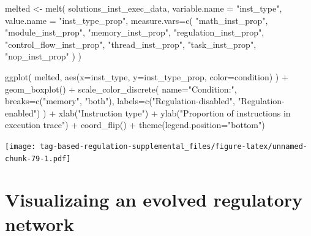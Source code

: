 \documentclass[
]{book}
\newenvironment{Shaded}{\begin{snugshade}}{\end{snugshade}}
\newcommand{\AttributeTok}[1]{\textcolor[rgb]{0.77,0.63,0.00}{#1}}
\newcommand{\FunctionTok}[1]{\textcolor[rgb]{0.00,0.00,0.00}{#1}}
\newcommand{\NormalTok}[1]{#1}
\newcommand{\OtherTok}[1]{\textcolor[rgb]{0.56,0.35,0.01}{#1}}
\newcommand{\SpecialCharTok}[1]{\textcolor[rgb]{0.00,0.00,0.00}{#1}}
\newcommand{\StringTok}[1]{\textcolor[rgb]{0.31,0.60,0.02}{#1}}
\begin{document}
\begin{Shaded}
\begin{Highlighting}[]
\NormalTok{melted }\OtherTok{\textless{}{-}} \FunctionTok{melt}\NormalTok{(}
\NormalTok{  solutions\_inst\_exec\_data,}
  \AttributeTok{variable.name =} \StringTok{"inst\_type"}\NormalTok{,}
  \AttributeTok{value.name =} \StringTok{"inst\_type\_prop"}\NormalTok{,}
  \AttributeTok{measure.vars=}\FunctionTok{c}\NormalTok{(}
    \StringTok{"math\_inst\_prop"}\NormalTok{,}
    \StringTok{"module\_inst\_prop"}\NormalTok{,}
    \StringTok{"memory\_inst\_prop"}\NormalTok{,}
    \StringTok{"regulation\_inst\_prop"}\NormalTok{,}
    \StringTok{"control\_flow\_inst\_prop"}\NormalTok{,}
    \StringTok{"thread\_inst\_prop"}\NormalTok{,}
    \StringTok{"task\_inst\_prop"}\NormalTok{,}
    \StringTok{"nop\_inst\_prop"}
\NormalTok{  )}
\NormalTok{)}

\FunctionTok{ggplot}\NormalTok{( melted, }\FunctionTok{aes}\NormalTok{(}\AttributeTok{x=}\NormalTok{inst\_type, }\AttributeTok{y=}\NormalTok{inst\_type\_prop, }\AttributeTok{color=}\NormalTok{condition) ) }\SpecialCharTok{+}
  \FunctionTok{geom\_boxplot}\NormalTok{() }\SpecialCharTok{+}
  \FunctionTok{scale\_color\_discrete}\NormalTok{(}
    \AttributeTok{name=}\StringTok{"Condition:"}\NormalTok{,}
    \AttributeTok{breaks=}\FunctionTok{c}\NormalTok{(}\StringTok{"memory"}\NormalTok{, }\StringTok{"both"}\NormalTok{),}
    \AttributeTok{labels=}\FunctionTok{c}\NormalTok{(}\StringTok{"Regulation{-}disabled"}\NormalTok{, }\StringTok{"Regulation{-}enabled"}\NormalTok{)}
\NormalTok{  ) }\SpecialCharTok{+}
  \FunctionTok{xlab}\NormalTok{(}\StringTok{"Instruction type"}\NormalTok{) }\SpecialCharTok{+}
  \FunctionTok{ylab}\NormalTok{(}\StringTok{"Proportion of instructions in execution trace"}\NormalTok{) }\SpecialCharTok{+}
  \FunctionTok{coord\_flip}\NormalTok{() }\SpecialCharTok{+}
  \FunctionTok{theme}\NormalTok{(}\AttributeTok{legend.position=}\StringTok{"bottom"}\NormalTok{)}
\end{Highlighting}
\end{Shaded}

\texttt{[image: tag-based-regulation-supplemental\_files/figure-latex/unnamed-chunk-79-1.pdf]}

\hypertarget{visualizaing-an-evolved-regulatory-network}{%
\section{Visualizaing an evolved regulatory network}\label{visualizaing-an-evolved-regulatory-network}}
\end{document}

